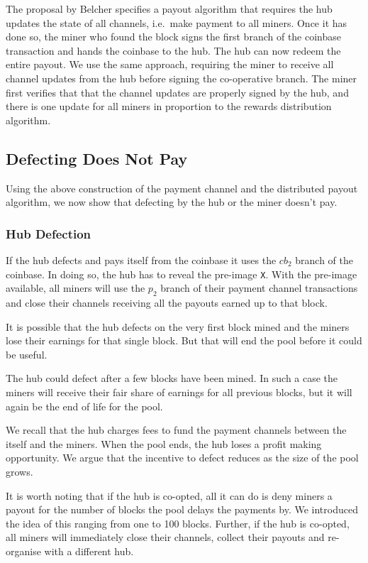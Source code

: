 \documentclass{article}
\begin{document}
The proposal by Belcher specifies a payout algorithm that requires the
hub updates the state of all channels, i.e.\ make payment to all
miners. Once it has done so, the miner who found the block signs the
first branch of the coinbase transaction and hands the coinbase to the
hub. The hub can now redeem the entire payout. We use the same
approach, requiring the miner to receive all channel updates from the
hub before signing the co-operative branch. The miner first verifies
that that the channel updates are properly signed by the hub, and
there is one update for all miners in proportion to the rewards
distribution algorithm.

\subsection{Defecting Does Not Pay}\label{ref:defecting}

Using the above construction of the payment channel and the
distributed payout algorithm, we now show that defecting by the hub or
the miner doesn't pay.

\subsubsection{Hub Defection}\label{ref:hub-defects}

If the hub defects and pays itself from the coinbase it uses the
$cb_2$ branch of the coinbase. In doing so, the hub has to reveal the
pre-image \verb|X|. With the pre-image available, all miners will use
the $p_2$ branch of their payment channel transactions and close their
channels receiving all the payouts earned up to that block.

It is possible that the hub defects on the very first block mined and
the miners lose their earnings for that single block. But that will
end the pool before it could be useful.

The hub could defect after a few blocks have been mined. In such a
case the miners will receive their fair share of earnings for all
previous blocks, but it will again be the end of life for the pool.

We recall that the hub charges fees to fund the payment channels
between the itself and the miners. When the pool ends, the hub loses a
profit making opportunity. We argue that the incentive to defect
reduces as the size of the pool grows.

It is worth noting that if the hub is co-opted, all it can do is deny
miners a payout for the number of blocks the pool delays the payments
by. We introduced the idea of this ranging from one to 100
blocks. Further, if the hub is co-opted, all miners will immediately
close their channels, collect their payouts and re-organise with a
different hub.
\end{document}
